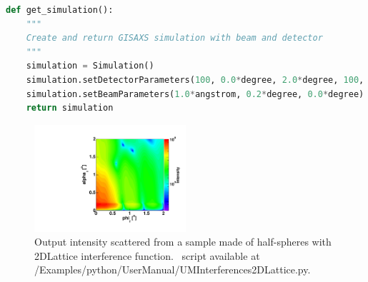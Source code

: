 \begin{lstlisting}[language=python, style=eclipseboxed,numbers=none,nolol]
def get_simulation():
    """
    Create and return GISAXS simulation with beam and detector
    """
    simulation = Simulation()
    simulation.setDetectorParameters(100, 0.0*degree, 2.0*degree, 100, 0.0*degree, 2.0*degree)
    simulation.setBeamParameters(1.0*angstrom, 0.2*degree, 0.0*degree)
    return simulation
\end{lstlisting}


\begin{figure}[h]
\begin{center}
\includegraphics[width=0.5\textwidth]{Figures/HSphere_2Dlattice}
\end{center}
\caption{Output intensity scattered from a sample made of half-spheres with 2DLattice interference function. \Python\ script available at {/Examples/python/UserManual/UMInterferences2DLattice.py}.}
\label{fig:2dlatticeintensity}
\end{figure}

\FloatBarrier

\newpage{\cleardoublepage}
